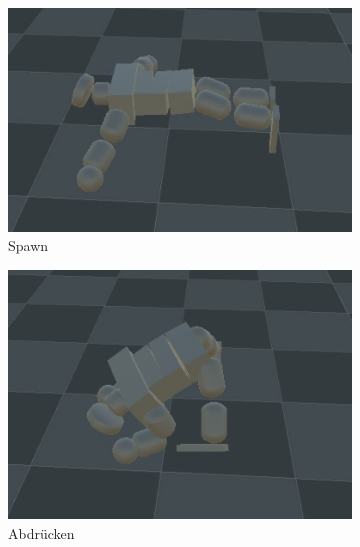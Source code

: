 \begin{figure}
	\centering
	\begin{subfigure}[b]{0.18\textwidth}
		\centering
		\includegraphics[width=\textwidth]{resources/img/2BAufstehen/Fall2_spawn}
		\caption{Spawn}
	\end{subfigure}
	\hfill
	\begin{subfigure}[b]{0.18\textwidth}
		\centering
		\includegraphics[width=\textwidth]{resources/img/2BAufstehen/Fall2_hoch}
		\caption{Abdrücken}
	\end{subfigure}
	\hfill
	\begin{subfigure}[b]{0.18\textwidth}
		\centering

\end{subfigure}
\end{figure}

